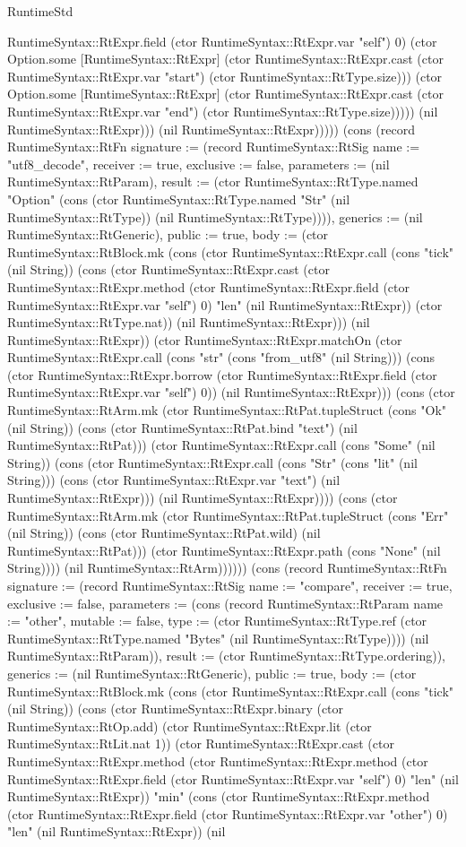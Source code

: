 \begin{lexlean}{RuntimeStd}
\begin{semanticmodule}
{RuntimeSyntax::RtExpr.field (ctor RuntimeSyntax::RtExpr.var "self") 0) (ctor Option.some [RuntimeSyntax::RtExpr] (ctor RuntimeSyntax::RtExpr.cast (ctor RuntimeSyntax::RtExpr.var "start") (ctor RuntimeSyntax::RtType.size))) (ctor Option.some [RuntimeSyntax::RtExpr] (ctor RuntimeSyntax::RtExpr.cast (ctor RuntimeSyntax::RtExpr.var "end") (ctor RuntimeSyntax::RtType.size))))) (nil RuntimeSyntax::RtExpr))) (nil RuntimeSyntax::RtExpr))))}) (cons (record RuntimeSyntax::RtFn {signature := (record RuntimeSyntax::RtSig {name := "utf8_decode", receiver := true, exclusive := false, parameters := (nil RuntimeSyntax::RtParam), result := (ctor RuntimeSyntax::RtType.named "Option" (cons (ctor RuntimeSyntax::RtType.named "Str" (nil RuntimeSyntax::RtType)) (nil RuntimeSyntax::RtType)))}), generics := (nil RuntimeSyntax::RtGeneric), public := true, body := (ctor RuntimeSyntax::RtBlock.mk (cons (ctor RuntimeSyntax::RtExpr.call (cons "tick" (nil String)) (cons (ctor RuntimeSyntax::RtExpr.cast (ctor RuntimeSyntax::RtExpr.method (ctor RuntimeSyntax::RtExpr.field (ctor RuntimeSyntax::RtExpr.var "self") 0) "len" (nil RuntimeSyntax::RtExpr)) (ctor RuntimeSyntax::RtType.nat)) (nil RuntimeSyntax::RtExpr))) (nil RuntimeSyntax::RtExpr)) (ctor RuntimeSyntax::RtExpr.matchOn (ctor RuntimeSyntax::RtExpr.call (cons "str" (cons "from_utf8" (nil String))) (cons (ctor RuntimeSyntax::RtExpr.borrow (ctor RuntimeSyntax::RtExpr.field (ctor RuntimeSyntax::RtExpr.var "self") 0)) (nil RuntimeSyntax::RtExpr))) (cons (ctor RuntimeSyntax::RtArm.mk (ctor RuntimeSyntax::RtPat.tupleStruct (cons "Ok" (nil String)) (cons (ctor RuntimeSyntax::RtPat.bind "text") (nil RuntimeSyntax::RtPat))) (ctor RuntimeSyntax::RtExpr.call (cons "Some" (nil String)) (cons (ctor RuntimeSyntax::RtExpr.call (cons "Str" (cons "lit" (nil String))) (cons (ctor RuntimeSyntax::RtExpr.var "text") (nil RuntimeSyntax::RtExpr))) (nil RuntimeSyntax::RtExpr)))) (cons (ctor RuntimeSyntax::RtArm.mk (ctor RuntimeSyntax::RtPat.tupleStruct (cons "Err" (nil String)) (cons (ctor RuntimeSyntax::RtPat.wild) (nil RuntimeSyntax::RtPat))) (ctor RuntimeSyntax::RtExpr.path (cons "None" (nil String)))) (nil RuntimeSyntax::RtArm)))))}) (cons (record RuntimeSyntax::RtFn {signature := (record RuntimeSyntax::RtSig {name := "compare", receiver := true, exclusive := false, parameters := (cons (record RuntimeSyntax::RtParam {name := "other", mutable := false, type := (ctor RuntimeSyntax::RtType.ref (ctor RuntimeSyntax::RtType.named "Bytes" (nil RuntimeSyntax::RtType)))}) (nil RuntimeSyntax::RtParam)), result := (ctor RuntimeSyntax::RtType.ordering)}), generics := (nil RuntimeSyntax::RtGeneric), public := true, body := (ctor RuntimeSyntax::RtBlock.mk (cons (ctor RuntimeSyntax::RtExpr.call (cons "tick" (nil String)) (cons (ctor RuntimeSyntax::RtExpr.binary (ctor RuntimeSyntax::RtOp.add) (ctor RuntimeSyntax::RtExpr.lit (ctor RuntimeSyntax::RtLit.nat 1)) (ctor RuntimeSyntax::RtExpr.cast (ctor RuntimeSyntax::RtExpr.method (ctor RuntimeSyntax::RtExpr.method (ctor RuntimeSyntax::RtExpr.field (ctor RuntimeSyntax::RtExpr.var "self") 0) "len" (nil RuntimeSyntax::RtExpr)) "min" (cons (ctor RuntimeSyntax::RtExpr.method (ctor RuntimeSyntax::RtExpr.field (ctor RuntimeSyntax::RtExpr.var "other") 0) "len" (nil RuntimeSyntax::RtExpr)) (nil }
\end{semanticmodule}
\end{lexlean}
